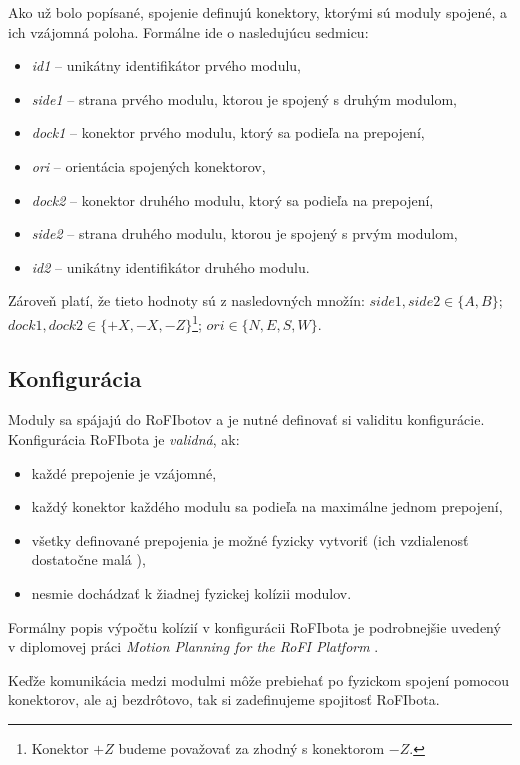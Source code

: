 \documentclass[
  printed, %
  oneside, %
  notable,   %
  nolof,     %
  nolot,     %
]{fithesis3}
\begin{document}
Ako už bolo popísané, spojenie definujú konektory, ktorými sú moduly spojené, a ich vzájomná poloha. Formálne ide o nasledujúcu sedmicu: 
\begin{itemize}
    \item \textit{id1} -- unikátny identifikátor prvého modulu, 
    \item \textit{side1} -- strana prvého modulu, ktorou je spojený s druhým modulom, 
    \item \textit{dock1} -- konektor prvého modulu, ktorý sa podieľa na prepojení,
    \item \textit{ori} -- orientácia spojených konektorov,
    \item \textit{dock2} -- konektor druhého modulu, ktorý sa podieľa na prepojení,
    \item \textit{side2} -- strana druhého modulu, ktorou je spojený s prvým modulom, 
    \item \textit{id2} -- unikátny identifikátor druhého modulu. 
\end{itemize}
Zároveň platí, že tieto hodnoty sú z nasledovných množín: $side1, side2 \in \{A, B\}$; $dock1, dock2 \in \{+X, -X, -Z\}$\footnote{Konektor $+Z$ budeme považovať za zhodný s konektorom $-Z$. }; $ori \in \{N, E, S, W\}$.

\subsection{Konfigurácia}
\label{sec:formalSpecCfg}
Moduly sa spájajú do RoFIbotov a je nutné definovať si validitu konfigurácie. Konfigurácia RoFIbota je \textit{validná}, ak: 
\begin{itemize}
    \item každé prepojenie je vzájomné,
    \item každý konektor každého modulu sa podieľa na maximálne jednom prepojení, 
    \item všetky definované prepojenia je možné fyzicky vytvoriť (ich vzdialenosť dostatočne malá \cite{rofiCom}), 
    \item nesmie dochádzať k žiadnej fyzickej kolízii modulov. 
\end{itemize}
Formálny popis výpočtu kolízií v konfigurácii RoFIbota je podrobnejšie uvedený v diplomovej práci \textit{Motion Planning for the RoFI Platform} \cite{vozarovaMasterThesis}. 

Keďže komunikácia medzi modulmi môže prebiehať po fyzickom spojení pomocou konektorov, ale aj bezdrôtovo, tak si zadefinujeme spojitosť RoFIbota. 
\end{document}
